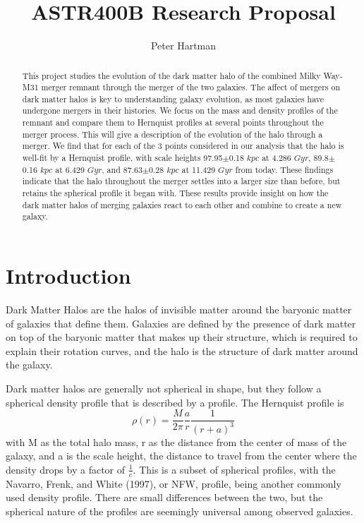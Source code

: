\documentclass[linenumbers]{aastex631}
\begin{document}
\title{ASTR400B Research Proposal}

\author{Peter Hartman}

\begin{abstract}
    This project studies the evolution of the dark matter halo of the combined Milky Way-M31 merger remnant through the merger of the two galaxies. The affect of mergers on dark matter halos is key to understanding galaxy evolution, as most galaxies have undergone mergers in their histories. We focus on the mass and density profiles of the remnant and compare them to Hernquist profiles at several points throughout the merger process. This will give a description of the evolution of the halo through a merger. We find that for each of the 3 points considered in our analysis that the halo is well-fit by a Hernquist profile, with scale heights 97.95$\pm$0.18 $kpc$ at 4.286 $Gyr$, 89.8$\pm$0.16 $kpc$ at 6.429 $Gyr$, and 87.63$\pm$0.28 $kpc$ at 11.429 $Gyr$ from today. These findings indicate that the halo throughout the merger settles into a larger size than before, but retains the spherical profile it began with. These results provide insight on how the dark matter halos of merging galaxies react to each other and combine to create a new galaxy.
\end{abstract}


\section{Introduction} \label{sec:intro}
Dark Matter Halos are the halos of invisible matter around the baryonic matter of galaxies that define them. Galaxies are defined by the presence of dark matter on top of the baryonic matter that makes up their structure, which is required to explain their rotation curves, and the halo is the structure of dark matter around the galaxy.

Dark matter halos are generally not spherical in shape, but they follow a spherical density profile that is described by a \cite{Hernquist} profile. The Hernquist profile is 
\begin{equation}
    \rho(r) = \frac{M}{2\pi} \frac{a}{r} \frac{1}{(r+a)^3} \label{eqn:Herndens}
\end{equation}
with M as the total halo mass, r as the distance from the center of mass of the galaxy, and a is the scale height, the distance to travel from the center where the density drops by a factor of $\frac{1}{e}$. This is a subset of spherical profiles, with the Navarro, Frenk, and White (1997), or NFW, profile, being another commonly used density profile. There are small differences between the two, but the spherical nature of the profiles are seemingly universal among observed galaxies.
\end{document}
